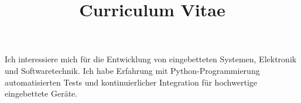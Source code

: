 \documentclass[a4paper,skipsamekey,11pt,english]{curve}
\title{Curriculum Vitae}
\begin{document}
\makeheaders[c]

\vspace{-2.5cm}
\begin{minipage}{0.66\textwidth}
Ich interessiere mich für die Entwicklung von eingebetteten Systemen, Elektronik und Softwaretechnik.
Ich habe Erfahrung mit Python-Programmierung automatisierten Tests und kontinuierlicher Integration für hochwertige eingebettete Geräte.
\end{minipage}
\vspace{0.5cm}






% 
\end{document}
